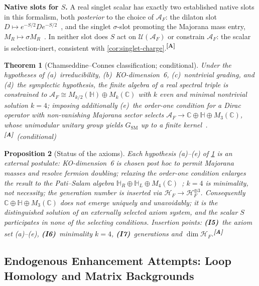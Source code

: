 \documentclass[12pt,a4paper,twoside]{article}
\theoremstyle{plain}
\newtheorem{theorem}{Theorem}[section]
\newtheorem{proposition}[theorem]{Proposition}
\theoremstyle{definition}
\theoremstyle{remark}
\newcommand{\catmark}[1]{\textsuperscript{\textsf{\textbf{[#1]}}}}
\begin{document}
\noindent\textbf{Native slots for $S$.} A real singlet scalar has exactly
two established native slots in this formalism, both \emph{posterior} to the
choice of $\mathcal{A}_F$: the dilaton slot
$D\mapsto e^{-S/2}De^{-S/2}$~\cite{cc2006}, and the singlet
$\sigma$-slot promoting the Majorana mass entry,
$M_R\mapsto\sigma M_R$~\cite{cc2012,ccvs2013}. In neither slot does $S$ act
on $\mathcal{U}(\mathcal{A}_F)$ or constrain $\mathcal{A}_F$: the scalar is
selection-inert, consistent with \cref{cor:singlet-charge}.\catmark{A}

\begin{theorem}[Chamseddine--Connes classification; conditional]
\label{thm:cc-classification}
Under the hypotheses of (a)~irreducibility, (b)~KO-dimension~6,
(c)~nontrivial grading, and (d)~the symplectic hypothesis, the finite
algebra of a real spectral triple is constrained to
$\mathcal{A}_F\cong M_{k/2}(\mathbb{H})\oplus M_k(\mathbb{C})$ with $k$
even and minimal nontrivial solution $k=4$; imposing additionally (e)~the
order-one condition for a Dirac operator with non-vanishing Majorana sector
selects $\mathcal{A}_F\to\mathbb{C}\oplus\mathbb{H}\oplus M_3(\mathbb{C})$,
whose unimodular unitary group yields $G_{\mathrm{SM}}$ up to a finite
kernel~\cite{cc2008}.\catmark{A}\ (conditional)
\end{theorem}

\begin{proposition}[Status of the axioms]
\label{prop:cc-axiom-status}
Each hypothesis (a)--(e) of \cref{thm:cc-classification} is an external
postulate: KO-dimension~6 is chosen post hoc to permit Majorana masses and
resolve fermion doubling; relaxing the order-one condition enlarges the
result to the Pati--Salam algebra
$\mathbb{H}_R\oplus\mathbb{H}_L\oplus M_4(\mathbb{C})$~\cite{ccvs2013,farnsworth2015};
$k=4$ is minimality, not necessity; the generation number is inserted via
$\mathcal{H}_F\to\mathcal{H}_F^{\oplus 3}$. Consequently
$\mathbb{C}\oplus\mathbb{H}\oplus M_3(\mathbb{C})$ does not emerge uniquely
and unavoidably; it is the distinguished solution of an externally selected
axiom system, and the scalar $S$ participates in none of the selecting
conditions. Insertion points: \textbf{(I5)}~the axiom set (a)--(e),
\textbf{(I6)}~minimality $k=4$, \textbf{(I7)}~generations and
$\dim\mathcal{H}_F$.\catmark{A}
\end{proposition}

\subsection{Endogenous Enhancement Attempts: Loop Homology and Matrix Backgrounds}
\label{app:endogenous}
\end{document}
